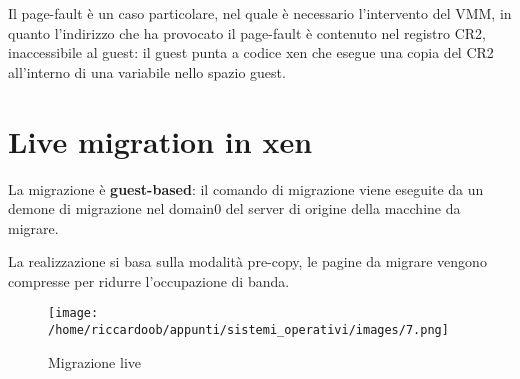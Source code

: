 Il page-fault è un caso particolare, nel quale è necessario l'intervento del VMM, in quanto l'indirizzo che ha provocato il page-fault è contenuto nel registro CR2, inaccessibile al guest: il guest punta a codice xen che esegue una copia del CR2 all'interno di una variabile nello spazio guest.

\section{Live migration in xen}
La migrazione è \textbf{guest-based}: il comando di migrazione viene eseguite da un demone di migrazione nel domain0 del server di origine della macchine da migrare.

La realizzazione si basa sulla modalità pre-copy, le pagine da migrare vengono compresse per ridurre l'occupazione di banda.

\begin{figure}[H]
	\caption{Migrazione live}
	\centering
	\texttt{[image: /home/riccardoob/appunti/sistemi\_operativi/images/7.png]}
\end{figure}

